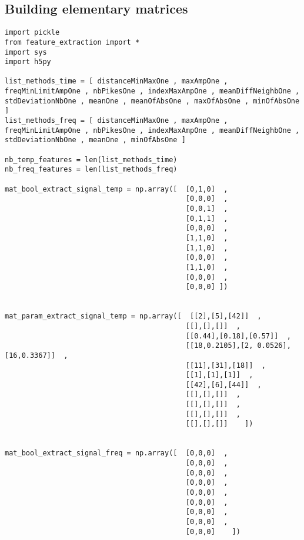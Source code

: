 \documentclass{article}
\begin{document}
\subsection{Building elementary matrices}
\begin{lstlisting}
import pickle
from feature_extraction import *
import sys
import h5py

list_methods_time = [ distanceMinMaxOne , maxAmpOne , freqMinLimitAmpOne , nbPikesOne , indexMaxAmpOne , meanDiffNeighbOne , stdDeviationNbOne , meanOne , meanOfAbsOne , maxOfAbsOne , minOfAbsOne ]
list_methods_freq = [ distanceMinMaxOne , maxAmpOne , freqMinLimitAmpOne , nbPikesOne , indexMaxAmpOne , meanDiffNeighbOne , stdDeviationNbOne , meanOne , minOfAbsOne ]

nb_temp_features = len(list_methods_time)
nb_freq_features = len(list_methods_freq)

mat_bool_extract_signal_temp = np.array([  [0,1,0]  ,
                                           [0,0,0]  ,
                                           [0,0,1]  ,
                                           [0,1,1]  ,
                                           [0,0,0]  ,
                                           [1,1,0]  ,
                                           [1,1,0]  ,
                                           [0,0,0]  ,
                                           [1,1,0]  ,
                                           [0,0,0]  ,
                                           [0,0,0] ])


mat_param_extract_signal_temp = np.array([  [[2],[5],[42]]  ,
                                           [[],[],[]]  ,
                                           [[0.44],[0.18],[0.57]]  ,
                                           [[18,0.2105],[2, 0.0526],[16,0.3367]]  ,
                                           [[11],[31],[18]]  ,
                                           [[1],[1],[1]]  ,
                                           [[42],[6],[44]]  ,
                                           [[],[],[]]  ,
                                           [[],[],[]]  ,
                                           [[],[],[]]  ,
                                           [[],[],[]]    ])


mat_bool_extract_signal_freq = np.array([  [0,0,0]  ,
                                           [0,0,0]  ,
                                           [0,0,0]  ,
                                           [0,0,0]  ,
                                           [0,0,0]  ,
                                           [0,0,0]  ,
                                           [0,0,0]  ,
                                           [0,0,0]  ,
                                           [0,0,0]    ])


\end{lstlisting}
\end{document}
